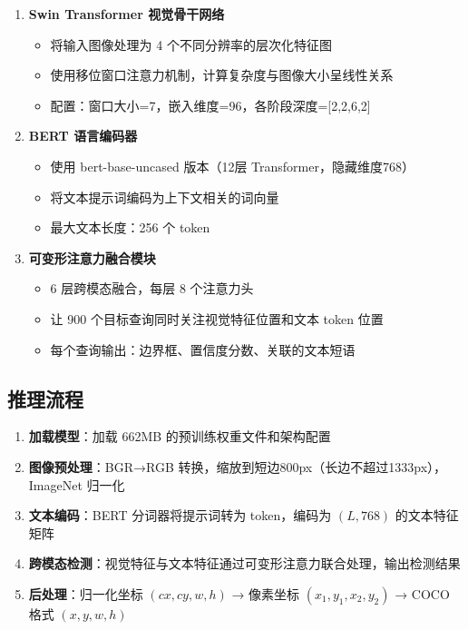 \documentclass[12pt,a4paper]{ctexart}
\begin{document}
\begin{enumerate}
    \item \textbf{Swin Transformer 视觉骨干网络}
    \begin{itemize}
        \item 将输入图像处理为 4 个不同分辨率的层次化特征图
        \item 使用移位窗口注意力机制，计算复杂度与图像大小呈线性关系
        \item 配置：窗口大小=7，嵌入维度=96，各阶段深度=[2,2,6,2]
    \end{itemize}

    \item \textbf{BERT 语言编码器}
    \begin{itemize}
        \item 使用 bert-base-uncased 版本（12层 Transformer，隐藏维度768）
        \item 将文本提示词编码为上下文相关的词向量
        \item 最大文本长度：256 个 token
    \end{itemize}

    \item \textbf{可变形注意力融合模块}
    \begin{itemize}
        \item 6 层跨模态融合，每层 8 个注意力头
        \item 让 900 个目标查询同时关注视觉特征位置和文本 token 位置
        \item 每个查询输出：边界框、置信度分数、关联的文本短语
    \end{itemize}
\end{enumerate}

\subsection{推理流程}

\begin{enumerate}
    \item \textbf{加载模型}：加载 662MB 的预训练权重文件和架构配置
    \item \textbf{图像预处理}：BGR→RGB 转换，缩放到短边800px（长边不超过1333px），ImageNet 归一化
    \item \textbf{文本编码}：BERT 分词器将提示词转为 token，编码为 $(L, 768)$ 的文本特征矩阵
    \item \textbf{跨模态检测}：视觉特征与文本特征通过可变形注意力联合处理，输出检测结果
    \item \textbf{后处理}：归一化坐标 $(cx,cy,w,h)$ → 像素坐标 $(x_1,y_1,x_2,y_2)$ → COCO 格式 $(x,y,w,h)$
\end{enumerate}
\end{document}
